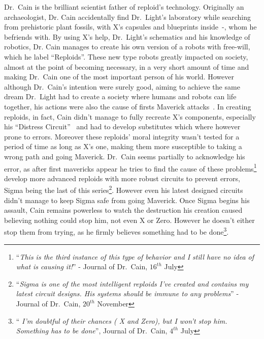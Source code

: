 Dr.~Cain is the brilliant scientist father of reploid's technology. Originally an archaeologist, Dr. Cain accidentally find Dr.~Light's laboratory while searching from prehistoric plant fossils, with X's capsules and blueprints inside~\cite{wiki:Cain_journal}-\cite{elysium_Cain_journal}, whom he befriends with. By using X's help, Dr.~Light's schematics and his knowledge of robotics, Dr. Cain manages to create his own version of a robots with free-will, which he label ``Reploids''. These new type robots greatly impacted on society, almost at the point of becoming necessary, in a very short amount of time and making Dr.~Cain one of the most important person of his world. However although Dr.~Cain's intention were surely good, aiming to achieve the same dream Dr.~Light had to create a society where humans and robots can life together, his actions were also the cause of firsts Maverick attacks~\cite{book:MH_field_guide}. In creating reploids, in fact, Cain didn't manage to fully recreate X's components, especially his ``Distress Circuit''~\cite{book:RMZ_Complete_works} and had to develop substitutes which where however prone to errors. Moreover these reploids' moral integrity wasn't tested for a period of time as long as X's one, making them more susceptible to taking a wrong path and going Maverick. Dr.~Cain seems partially to acknowledge his error, as after first mavericks appear he tries to find the cause of these problems\footnote{``\textit{This is the third instance of this type of behavior and I still have no idea of what is causing it!}'' - Journal of Dr.~Cain, $16^{th}$ July} develop more advanced reploids with more robust circuits to prevent errors, Sigma being the last of this series\footnote{``\textit{Sigma is one of the most intelligent reploids I've created and contains my latest circuit designs. His systems should be immune to any problems}'' - Journal of Dr.~Cain, $20^{th}$ November}. However even his latest designed circuits didn't manage to keep Sigma safe from going Maverick. Once Sigma begins his assault, Cain remains powerless to watch the destruction his creation caused believing nothing could stop him, not even X or Zero. However he doesn't either stop them from trying, as  he firmly believes something had to be done\footnote{``\textit{ I'm doubtful of their chances ( X and Zero), but I won't stop him. Something has to be done}'', Journal of Dr.~Cain, $4^{th}$ July}.

